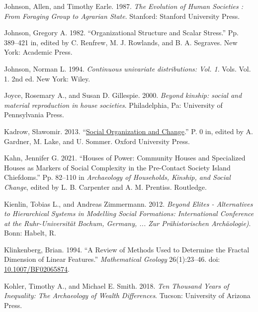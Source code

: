 \documentclass[
  12pt,
]{book}
\newlength{\cslhangindent}
\newlength{\cslentryspacingunit} %
\newenvironment{CSLReferences}[2] %
 {%
  \setlength{\parindent}{0pt}
  \ifodd #1
  \let\oldpar\par
  \def\par{\hangindent=\cslhangindent\oldpar}
  \fi
  \setlength{\parskip}{#2\cslentryspacingunit}
 }%
 {}
\begin{document}
\begin{CSLReferences}{1}{0}
\leavevmode{}%
Johnson, Allen, and Timothy Earle. 1987. \emph{The Evolution of Human Societies : From Foraging Group to Agrarian State}. Stanford: Stanford University Press.

\leavevmode{}%
Johnson, Gregory A. 1982. {``Organizational Structure and Scalar Stress.''} Pp. 389--421 in, edited by C. Renfrew, M. J. Rowlands, and B. A. Segraves. New York: Academic Press.

\leavevmode{}%
Johnson, Norman L. 1994. \emph{Continuous univariate distributions: Vol. 1}. Vols. Vol. 1. 2nd ed. New York: Wiley.

\leavevmode{}%
Joyce, Rosemary A., and Susan D. Gillespie. 2000. \emph{Beyond kinship: social and material reproduction in house societies}. Philadelphia, Pa: University of Pennsylvania Press.

\leavevmode{}%
Kadrow, Sławomir. 2013. {``\href{https://doi.org/10.1093/oxfordhb/9780199567942.013.023}{Social Organization and Change}.''} P. 0 in, edited by A. Gardner, M. Lake, and U. Sommer. Oxford University Press.

\leavevmode{}%
Kahn, Jennifer G. 2021. {``Houses of Power: {Community} Houses and Specialized Houses as Markers of Social Complexity in the Pre-Contact {Society Island} Chiefdoms.''} Pp. 82--110 in \emph{Archaeology of {Households}, {Kinship}, and {Social Change}}, edited by L. B. Carpenter and A. M. Prentiss. {Routledge}.

\leavevmode{}%
Kienlin, Tobias L., and Andreas Zimmermann. 2012. \emph{Beyond Elites - Alternatives to Hierarchical Systems in Modelling Social Formations: International Conference at the Ruhr-Universität Bochum, Germany, ... Zur Prähistorischen Archäologie)}. Bonn: Habelt, R.

\leavevmode{}%
Klinkenberg, Brian. 1994. {``A Review of Methods Used to Determine the Fractal Dimension of Linear Features.''} \emph{Mathematical Geology} 26(1):23--46. doi: \href{https://doi.org/10.1007/BF02065874}{10.1007/BF02065874}.

\leavevmode{}%
Kohler, Timothy A., and Michael E. Smith. 2018. \emph{Ten Thousand Years of Inequality: The Archaeology of Wealth Differences}. Tucson: University of Arizona Press.


\end{CSLReferences}
\end{document}
